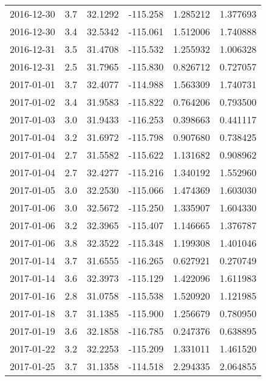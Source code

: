 \begin{tabular}{lrrrrr}
2016-12-30 &       3.7 &  32.1292 &  -115.258 &         1.285212 &         1.377693 \\
2016-12-30 &       3.4 &  32.5342 &  -115.061 &         1.512006 &         1.740888 \\
2016-12-31 &       3.5 &  31.4708 &  -115.532 &         1.255932 &         1.006328 \\
2016-12-31 &       2.5 &  31.7965 &  -115.830 &         0.826712 &         0.727057 \\
2017-01-01 &       3.7 &  32.4077 &  -114.988 &         1.563309 &         1.740731 \\
2017-01-02 &       3.4 &  31.9583 &  -115.822 &         0.764206 &         0.793500 \\
2017-01-03 &       3.0 &  31.9433 &  -116.253 &         0.398663 &         0.441117 \\
2017-01-04 &       3.2 &  31.6972 &  -115.798 &         0.907680 &         0.738425 \\
2017-01-04 &       2.7 &  31.5582 &  -115.622 &         1.131682 &         0.908962 \\
2017-01-04 &       2.7 &  32.4277 &  -115.216 &         1.340192 &         1.552960 \\
2017-01-05 &       3.0 &  32.2530 &  -115.066 &         1.474369 &         1.603030 \\
2017-01-06 &       3.0 &  32.5672 &  -115.250 &         1.335907 &         1.604330 \\
2017-01-06 &       3.2 &  32.3965 &  -115.407 &         1.146665 &         1.376787 \\
2017-01-06 &       3.8 &  32.3522 &  -115.348 &         1.199308 &         1.401046 \\
2017-01-14 &       3.7 &  31.6555 &  -116.265 &         0.627921 &         0.270749 \\
2017-01-14 &       3.6 &  32.3973 &  -115.129 &         1.422096 &         1.611983 \\
2017-01-16 &       2.8 &  31.0758 &  -115.538 &         1.520920 &         1.121985 \\
2017-01-18 &       3.7 &  31.1385 &  -115.900 &         1.256679 &         0.780950 \\
2017-01-19 &       3.6 &  32.1858 &  -116.785 &         0.247376 &         0.638895 \\
2017-01-22 &       3.2 &  32.2253 &  -115.209 &         1.331011 &         1.461520 \\
2017-01-25 &       3.7 &  31.1358 &  -114.518 &         2.294335 &         2.064855 \\

\end{tabular}
